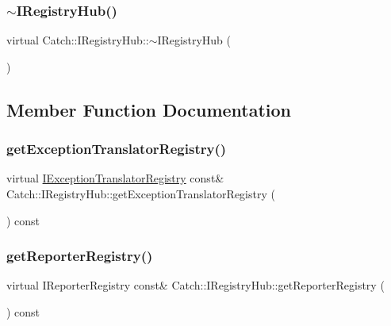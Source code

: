\subsubsection{\texorpdfstring{$\sim$IRegistryHub()}{~IRegistryHub()}}
{\footnotesize\ttfamily virtual Catch\+::\+I\+Registry\+Hub\+::$\sim$\+I\+Registry\+Hub (\begin{DoxyParamCaption}{ }\end{DoxyParamCaption})\hspace{0.3cm}{\ttfamily [virtual]}}



\subsection{Member Function Documentation}
\mbox{\label{struct_catch_1_1_i_registry_hub_a48347c170d9c583af73027a27b2f0bd4}} 
\subsubsection{\texorpdfstring{getExceptionTranslatorRegistry()}{getExceptionTranslatorRegistry()}}
{\footnotesize\ttfamily virtual \mbox{\hyperlink{struct_catch_1_1_i_exception_translator_registry}{I\+Exception\+Translator\+Registry}} const\& Catch\+::\+I\+Registry\+Hub\+::get\+Exception\+Translator\+Registry (\begin{DoxyParamCaption}{ }\end{DoxyParamCaption}) const\hspace{0.3cm}{\ttfamily [pure virtual]}}

\mbox{\label{struct_catch_1_1_i_registry_hub_a55534563f7ecf7e20ec1e37285ebe54d}} 
\subsubsection{\texorpdfstring{getReporterRegistry()}{getReporterRegistry()}}
{\footnotesize\ttfamily virtual I\+Reporter\+Registry const\& Catch\+::\+I\+Registry\+Hub\+::get\+Reporter\+Registry (\begin{DoxyParamCaption}{ }\end{DoxyParamCaption}) const\hspace{0.3cm}{\ttfamily [pure virtual]}}


